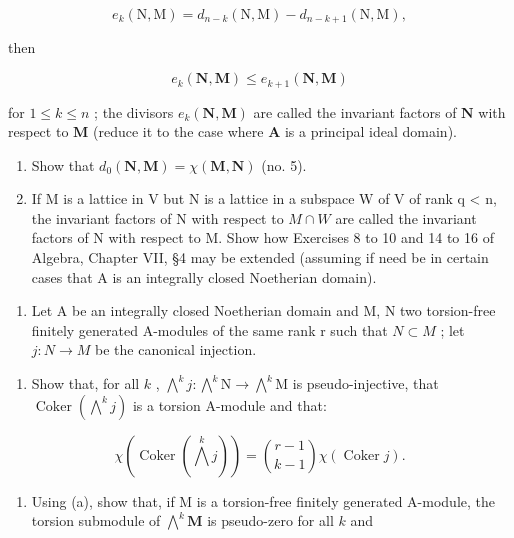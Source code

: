 \[
e _ {k} (\mathrm{N}, \mathrm{M}) = d _ {n - k} (\mathrm{N}, \mathrm{M}) - d _ {n - k + 1} (\mathrm{N}, \mathrm{M}),
\]

then

\[
e _ {k} (\mathbf {N}, \mathbf {M}) \leqslant e _ {k + 1} (\mathbf {N}, \mathbf {M})
\]

for \(1 \leqslant k \leqslant n\) ; the divisors \(e_k(\mathbf{N}, \mathbf{M})\) are called the invariant factors of \(\mathbf{N}\) with respect to \(\mathbf{M}\) (reduce it to the case where \(\mathbf{A}\) is a principal ideal domain).

\begin{enumerate}
\def\labelenumi{(\alph{enumi})}
\setcounter{enumi}{2}
\item
  Show that \(d_0(\mathbf{N}, \mathbf{M}) = \chi(\mathbf{M}, \mathbf{N})\) (no. 5).
\item
  If M is a lattice in V but N is a lattice in a subspace W of V of rank q \textless{} n, the invariant factors of N with respect to \(M \cap W\) are called the invariant factors of N with respect to M. Show how Exercises 8 to 10 and 14 to 16 of Algebra, Chapter VII, §4 may be extended (assuming if need be in certain cases that A is an integrally closed Noetherian domain).
\end{enumerate}

\begin{enumerate}
\def\labelenumi{\arabic{enumi}.}
\setcounter{enumi}{11}
\tightlist
\item
  Let A be an integrally closed Noetherian domain and M, N two torsion-free finitely generated A-modules of the same rank r such that \(N \subset M\) ; let \(j: N \to M\) be the canonical injection.
\end{enumerate}

\begin{enumerate}
\def\labelenumi{(\alph{enumi})}
\tightlist
\item
  Show that, for all \(k\) , \(\bigwedge^{k}j\colon\bigwedge^{k}\mathrm{N}\to\bigwedge^{k}\mathrm{M}\) is pseudo-injective, that \(\operatorname{Coker}\left(\bigwedge^{k}j\right)\) is a torsion A-module and that:
\end{enumerate}

\[
\chi \left(\operatorname{Coker} \left(\bigwedge^ {k} j\right)\right) = \binom {r - 1} {k - 1} \chi (\operatorname{Coker} j).
\]

\begin{enumerate}
\def\labelenumi{(\alph{enumi})}
\setcounter{enumi}{1}
\tightlist
\item
  Using (a), show that, if M is a torsion-free finitely generated A-module, the torsion submodule of \(\bigwedge^{k}\mathbf{M}\) is pseudo-zero for all \(k\) and
\end{enumerate}

